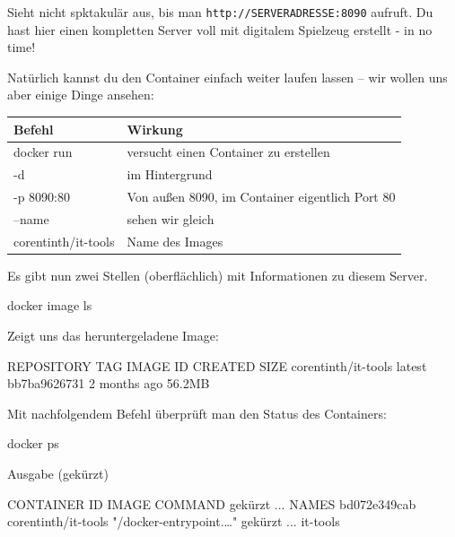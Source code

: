 \documentclass[
  letterpaper,
  DIV=11]{scrreprt}
\newenvironment{Shaded}{\begin{snugshade}}{\end{snugshade}}
\newcommand{\ExtensionTok}[1]{\textcolor[rgb]{0.00,0.23,0.31}{#1}}
\newcommand{\NormalTok}[1]{\textcolor[rgb]{0.00,0.23,0.31}{#1}}
\newcommand{\StringTok}[1]{\textcolor[rgb]{0.13,0.47,0.30}{#1}}
\begin{document}
Sieht nicht spktakulär aus, bis man \texttt{http://SERVERADRESSE:8090}
aufruft. Du hast hier einen kompletten Server voll mit digitalem
Spielzeug erstellt - in no time!

Natürlich kannst du den Container einfach weiter laufen lassen -- wir
wollen uns aber einige Dinge ansehen:

\begin{longtable}[]{@{}ll@{}}
\toprule\noalign{}
Befehl & Wirkung \\
\midrule\noalign{}
\endhead
\bottomrule\noalign{}
\endlastfoot
docker run & versucht einen Container zu erstellen \\
-d & im Hintergrund \\
-p 8090:80 & Von außen 8090, im Container eigentlich Port 80 \\
--name & sehen wir gleich \\
corentinth/it-tools & Name des Images \\
\end{longtable}

Es gibt nun zwei Stellen (oberflächlich) mit Informationen zu diesem
Server.

\begin{Shaded}
\begin{Highlighting}[]
\ExtensionTok{docker}\NormalTok{ image ls}
\end{Highlighting}
\end{Shaded}

Zeigt uns das heruntergeladene Image:

\begin{Shaded}
\begin{Highlighting}[]
\ExtensionTok{REPOSITORY}\NormalTok{             TAG       IMAGE ID       CREATED        SIZE}
\ExtensionTok{corentinth/it{-}tools}\NormalTok{    latest    bb7ba9626731   2 months ago   56.2MB}
\end{Highlighting}
\end{Shaded}

Mit nachfolgendem Befehl überprüft man den Status des Containers:

\begin{Shaded}
\begin{Highlighting}[]
\ExtensionTok{docker}\NormalTok{ ps }
\end{Highlighting}
\end{Shaded}

Ausgabe (gekürzt)

\begin{Shaded}
\begin{Highlighting}[]
\ExtensionTok{CONTAINER}\NormalTok{ ID   IMAGE                 COMMAND                  gekürzt ... NAMES }
\ExtensionTok{bd072e349cab}\NormalTok{   corentinth/it{-}tools   }\StringTok{"/docker{-}entrypoint.…"}\NormalTok{   gekürzt ... it{-}tools}
\end{Highlighting}
\end{Shaded}
\end{document}
